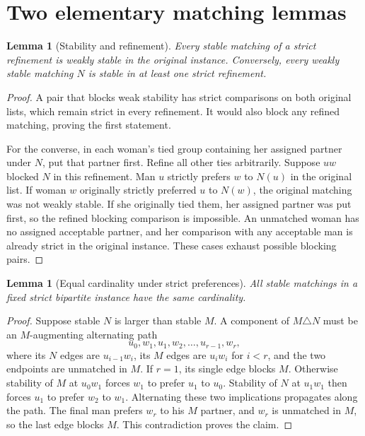 \documentclass[11pt,a4paper]{article}
\newtheorem{lemma}[theorem]{Lemma}
\theoremstyle{definition}
\theoremstyle{remark}
\begin{document}
\section{Two elementary matching lemmas}
\begin{lemma}[Stability and refinement]
Every stable matching of a strict refinement is weakly stable in the original instance. Conversely, every weakly stable matching $N$ is stable in at least one strict refinement.
\end{lemma}
\begin{proof}
A pair that blocks weak stability has strict comparisons on both original lists, which remain strict in every refinement. It would also block any refined matching, proving the first statement.

For the converse, in each woman's tied group containing her assigned partner under $N$, put that partner first. Refine all other ties arbitrarily. Suppose $uw$ blocked $N$ in this refinement. Man $u$ strictly prefers $w$ to $N(u)$ in the original list. If woman $w$ originally strictly preferred $u$ to $N(w)$, the original matching was not weakly stable. If she originally tied them, her assigned partner was put first, so the refined blocking comparison is impossible. An unmatched woman has no assigned acceptable partner, and her comparison with any acceptable man is already strict in the original instance. These cases exhaust possible blocking pairs.
\end{proof}

\begin{lemma}[Equal cardinality under strict preferences]
All stable matchings in a fixed strict bipartite instance have the same cardinality.
\end{lemma}
\begin{proof}
Suppose stable $N$ is larger than stable $M$. A component of $M\triangle N$ must be an $M$-augmenting alternating path
\[
 u_0,w_1,u_1,w_2,\ldots,u_{r-1},w_r,
\]
where its $N$ edges are $u_{i-1}w_i$, its $M$ edges are $u_iw_i$ for $i<r$, and the two endpoints are unmatched in $M$. If $r=1$, its single edge blocks $M$. Otherwise stability of $M$ at $u_0w_1$ forces $w_1$ to prefer $u_1$ to $u_0$. Stability of $N$ at $u_1w_1$ then forces $u_1$ to prefer $w_2$ to $w_1$. Alternating these two implications propagates along the path. The final man prefers $w_r$ to his $M$ partner, and $w_r$ is unmatched in $M$, so the last edge blocks $M$. This contradiction proves the claim.
\end{proof}
\end{document}
